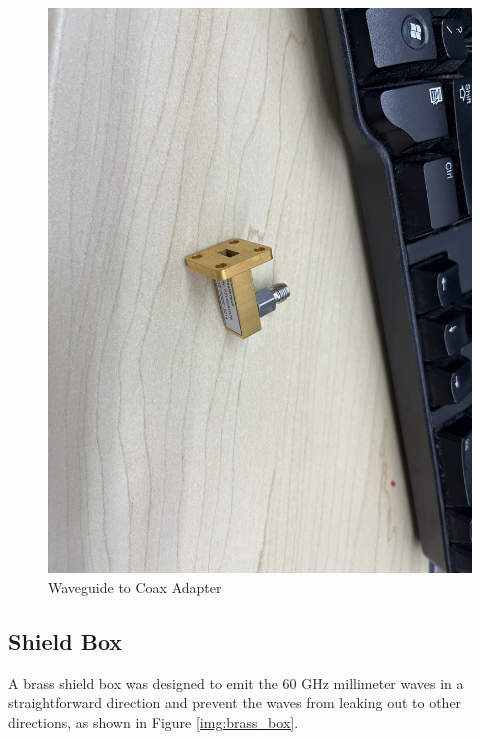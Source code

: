 \documentclass[a4paper,12pt]{report}
\begin{document}
\begin{figure}
\begin{minipage}{0.45\textwidth}
    \includegraphics[clip, keepaspectratio, width=0.9\linewidth]{img/waveguide_coax_adapter.jpg}
    \caption{Waveguide to Coax Adapter}
    \label{img:waveguide_coax_adapter}
  \end{minipage}\hfill
\end{figure}

\subsection{Shield Box}

A brass shield box was designed to
emit the 60 GHz millimeter waves
in a straightforward direction and
prevent the waves from leaking out
to other directions,
as shown in Figure \ref{img:brass_box}.
\end{document}
